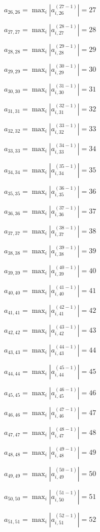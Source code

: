 \documentclass[a4paper,12pt]{article}
\begin{document}
$a _{ 26, 26 } =  \max _i |a _{ i, 26 } ^{ (27 - 1) } | = 27$

$a _{ 27, 27 } =  \max _i |a _{ i, 27 } ^{ (28 - 1) } | = 28$

$a _{ 28, 28 } =  \max _i |a _{ i, 28 } ^{ (29 - 1) } | = 29$

$a _{ 29, 29 } =  \max _i |a _{ i, 29 } ^{ (30 - 1) } | = 30$

$a _{ 30, 30 } =  \max _i |a _{ i, 30 } ^{ (31 - 1) } | = 31$

$a _{ 31, 31 } =  \max _i |a _{ i, 31 } ^{ (32 - 1) } | = 32$

$a _{ 32, 32 } =  \max _i |a _{ i, 32 } ^{ (33 - 1) } | = 33$

$a _{ 33, 33 } =  \max _i |a _{ i, 33 } ^{ (34 - 1) } | = 34$

$a _{ 34, 34 } =  \max _i |a _{ i, 34 } ^{ (35 - 1) } | = 35$

$a _{ 35, 35 } =  \max _i |a _{ i, 35 } ^{ (36 - 1) } | = 36$

$a _{ 36, 36 } =  \max _i |a _{ i, 36 } ^{ (37 - 1) } | = 37$

$a _{ 37, 37 } =  \max _i |a _{ i, 37 } ^{ (38 - 1) } | = 38$

$a _{ 38, 38 } =  \max _i |a _{ i, 38 } ^{ (39 - 1) } | = 39$

$a _{ 39, 39 } =  \max _i |a _{ i, 39 } ^{ (40 - 1) } | = 40$

$a _{ 40, 40 } =  \max _i |a _{ i, 40 } ^{ (41 - 1) } | = 41$

$a _{ 41, 41 } =  \max _i |a _{ i, 41 } ^{ (42 - 1) } | = 42$

$a _{ 42, 42 } =  \max _i |a _{ i, 42 } ^{ (43 - 1) } | = 43$

$a _{ 43, 43 } =  \max _i |a _{ i, 43 } ^{ (44 - 1) } | = 44$

$a _{ 44, 44 } =  \max _i |a _{ i, 44 } ^{ (45 - 1) } | = 45$

$a _{ 45, 45 } =  \max _i |a _{ i, 45 } ^{ (46 - 1) } | = 46$

$a _{ 46, 46 } =  \max _i |a _{ i, 46 } ^{ (47 - 1) } | = 47$

$a _{ 47, 47 } =  \max _i |a _{ i, 47 } ^{ (48 - 1) } | = 48$

$a _{ 48, 48 } =  \max _i |a _{ i, 48 } ^{ (49 - 1) } | = 49$

$a _{ 49, 49 } =  \max _i |a _{ i, 49 } ^{ (50 - 1) } | = 50$

$a _{ 50, 50 } =  \max _i |a _{ i, 50 } ^{ (51 - 1) } | = 51$

$a _{ 51, 51 } =  \max _i |a _{ i, 51 } ^{ (52 - 1) } | = 52$
\end{document}
